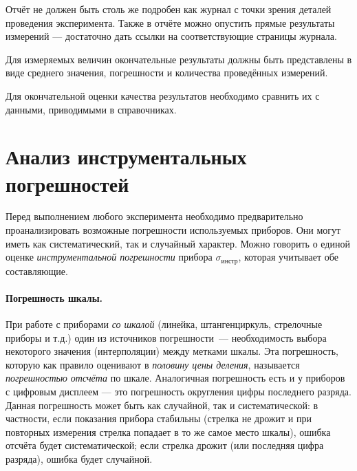 Отчёт не должен быть столь же подробен как журнал с точки зрения деталей проведения эксперимента. Также в отчёте можно опустить прямые результаты измерений --- достаточно дать ссылки на соответствующие страницы журнала.

Для измеряемых величин окончательные результаты должны быть представлены
в виде среднего значения, погрешности и количества проведённых измерений.

Для окончательной оценки качества результатов необходимо
сравнить их с данными, приводимыми в справочниках.


\section{Анализ инструментальных погрешностей}

Перед выполнением любого эксперимента необходимо предварительно проанализировать
возможные погрешности используемых приборов. Они могут
иметь как систематический, так и случайный характер. Можно говорить
о единой оценке \emph{инструментальной погрешности} прибора
$\sigma_{\text{инстр}}$, которая учитывает обе составляющие.

\paragraph{Погрешность шкалы.}
При работе с приборами \emph{со шкалой} (линейка, штангенциркуль, стрелочные
приборы и т.д.) один из источников погрешности~--- необходимость
выбора некоторого значения (интерполяции) между метками шкалы. Эта
погрешность, которую как правило оценивают в \emph{половину цены деления},
называется \emph{погрешностью отсчёта} по шкале. Аналогичная погрешность
есть и у приборов с цифровым дисплеем --- это погрешность
округления цифры последнего разряда. Данная погрешность может быть
как случайной, так и систематической: в частности, если показания
прибора стабильны (стрелка не дрожит и при повторных измерения стрелка
попадает в то же самое место шкалы), ошибка отсчёта будет систематической;
если стрелка дрожит (или  последняя цифра разряда),
ошибка будет случайной.

